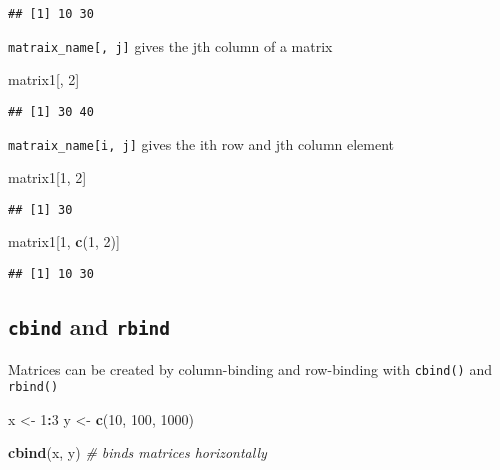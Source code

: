 \documentclass[]{book}
\newenvironment{Shaded}{\begin{snugshade}}{\end{snugshade}}
\newcommand{\CommentTok}[1]{\textcolor[rgb]{0.56,0.35,0.01}{\textit{#1}}}
\newcommand{\DecValTok}[1]{\textcolor[rgb]{0.00,0.00,0.81}{#1}}
\newcommand{\KeywordTok}[1]{\textcolor[rgb]{0.13,0.29,0.53}{\textbf{#1}}}
\newcommand{\NormalTok}[1]{#1}
\newcommand{\OperatorTok}[1]{\textcolor[rgb]{0.81,0.36,0.00}{\textbf{#1}}}
\newcommand{\StringTok}[1]{\textcolor[rgb]{0.31,0.60,0.02}{#1}}
\begin{document}
\begin{verbatim}
## [1] 10 30
\end{verbatim}

\texttt{matraix\_name{[},\ j{]}} gives the jth column of a matrix

\begin{Shaded}
\begin{Highlighting}[]
\NormalTok{matrix1[, }\DecValTok{2}\NormalTok{]}
\end{Highlighting}
\end{Shaded}

\begin{verbatim}
## [1] 30 40
\end{verbatim}

\texttt{matraix\_name{[}i,\ j{]}} gives the ith row and jth column element

\begin{Shaded}
\begin{Highlighting}[]
\NormalTok{matrix1[}\DecValTok{1}\NormalTok{, }\DecValTok{2}\NormalTok{]}
\end{Highlighting}
\end{Shaded}

\begin{verbatim}
## [1] 30
\end{verbatim}

\begin{Shaded}
\begin{Highlighting}[]
\NormalTok{matrix1[}\DecValTok{1}\NormalTok{, }\KeywordTok{c}\NormalTok{(}\DecValTok{1}\NormalTok{, }\DecValTok{2}\NormalTok{)] }
\end{Highlighting}
\end{Shaded}

\begin{verbatim}
## [1] 10 30
\end{verbatim}

\hypertarget{cbind-and-rbind}{%
\subsection{\texorpdfstring{\texttt{cbind} and \texttt{rbind}}{cbind and rbind}}\label{cbind-and-rbind}}

Matrices can be created by column-binding and row-binding with \texttt{cbind()} and \texttt{rbind()}

\begin{Shaded}
\begin{Highlighting}[]
\NormalTok{x <-}\StringTok{ }\DecValTok{1}\OperatorTok{:}\DecValTok{3}
\NormalTok{y <-}\StringTok{ }\KeywordTok{c}\NormalTok{(}\DecValTok{10}\NormalTok{, }\DecValTok{100}\NormalTok{, }\DecValTok{1000}\NormalTok{)}

\KeywordTok{cbind}\NormalTok{(x, y) }\CommentTok{# binds matrices horizontally}
\end{Highlighting}
\end{Shaded}
\end{document}
